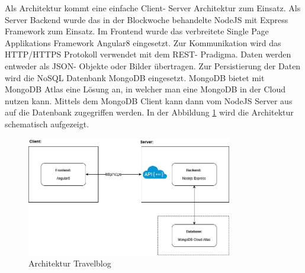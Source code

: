 \documentclass[../main.tex]{subfiles}
\begin{document}
Als Architektur kommt eine einfache Client- Server Architektur zum Einsatz. Als Server Backend wurde das in der Blockwoche behandelte NodeJS mit Express Framework zum Einsatz. Im Frontend wurde das verbreitete Single Page Applikations Framework Angular8 eingesetzt. Zur Kommunikation wird das HTTP/HTTPS Protokoll verwendet mit dem REST- Pradigma. Daten werden entweder als JSON- Objekte oder Bilder übertragen. Zur Persistierung der Daten wird die NoSQL Datenbank MongoDB eingesetzt. MongoDB bietet mit MongoDB Atlas eine Lösung an, in welcher man eine MongoDB in der Cloud nutzen kann. Mittels dem MongoDB Client kann dann vom NodeJS Server aus auf die Datenbank zugegriffen werden. In der Abbildung \ref{fig:architektur} wird die Architektur schematisch aufgezeigt.

\vspace{0.5cm}
\begin{figure}[h]
    \centering
    \includegraphics[width=0.8\textwidth]{architektur}
    \caption{Architektur Travelblog}
    \label{fig:architektur}
\end{figure}
\end{document}
